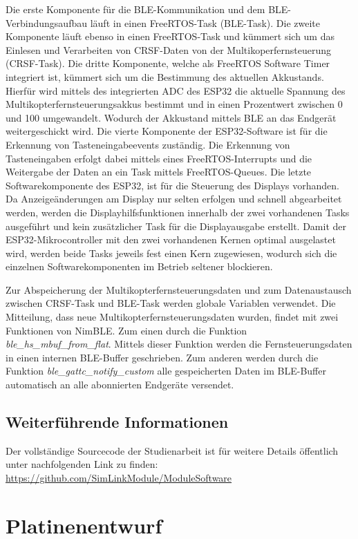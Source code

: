 Die erste Komponente für die \ac{BLE}-Kommunikation und dem \ac{BLE}-Verbindungsaufbau läuft in einen FreeRTOS-Task (\ac{BLE}-Task). Die zweite Komponente läuft ebenso in einen FreeRTOS-Task und kümmert sich um das Einlesen und Verarbeiten von CRSF-Daten von der Multikoperfernsteuerung (CRSF-Task). Die dritte Komponente, welche als FreeRTOS Software Timer integriert ist, kümmert sich um die Bestimmung des aktuellen Akkustands. Hierfür wird mittels des integrierten \ac{ADC} des ESP32 die aktuelle Spannung des Multikopterfernsteuerungsakkus bestimmt und in einen Prozentwert zwischen 0 und 100 umgewandelt. Wodurch der Akkustand mittels \ac{BLE} an das Endgerät weitergeschickt wird. Die vierte Komponente der ESP32-Software ist für die Erkennung von Tasteneingabeevents zuständig. Die Erkennung von Tasteneingaben erfolgt dabei mittels eines FreeRTOS-Interrupts und die Weitergabe der Daten an ein Task mittels FreeRTOS-Queues. Die letzte Softwarekomponente des ESP32, ist für die Steuerung des Displays vorhanden. Da Anzeigeänderungen am Display nur selten erfolgen und schnell abgearbeitet werden, werden die Displayhilfsfunktionen innerhalb der zwei vorhandenen Tasks ausgeführt und kein zusätzlicher Task für die Displayausgabe erstellt. Damit der ESP32-Mikrocontroller mit den zwei vorhandenen Kernen optimal ausgelastet wird, werden beide Tasks jeweils fest einen Kern zugewiesen, wodurch sich die einzelnen Softwarekomponenten im Betrieb seltener blockieren.

Zur Abspeicherung der Multikopterfernsteuerungsdaten und zum Datenaustausch zwischen CRSF-Task und \ac{BLE}-Task werden globale Variablen verwendet. Die Mitteilung, dass neue Multikopterfernsteuerungsdaten wurden, findet mit zwei Funktionen von NimBLE. Zum einen durch die Funktion  \textit{ble\_hs\_mbuf\_from\_flat}. Mittels dieser Funktion werden die Fernsteuerungsdaten in einen internen \ac{BLE}-Buffer geschrieben. Zum anderen werden durch die Funktion \textit{ble\_gattc\_notify\_custom} alle gespeicherten Daten im \ac{BLE}-Buffer automatisch an alle abonnierten Endgeräte versendet.

\subsection{Weiterführende Informationen}
Der vollständige Sourcecode der Studienarbeit ist für weitere Details öffentlich unter nachfolgenden Link zu finden: \url{https://github.com/SimLinkModule/ModuleSoftware}

\section{Platinenentwurf}

